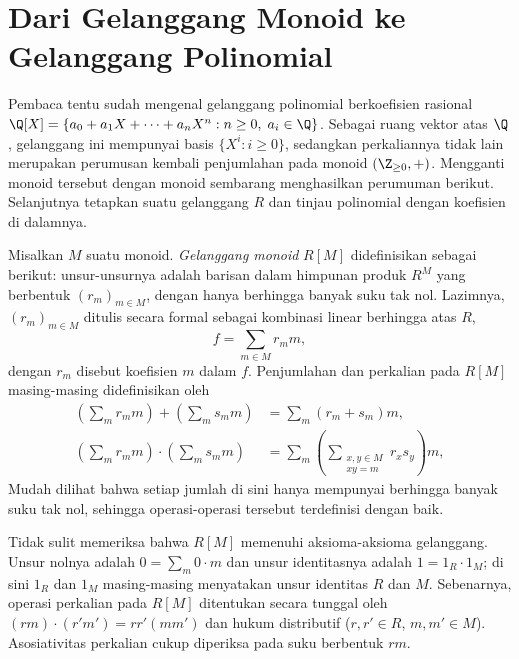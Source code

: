 \section{Dari Gelanggang Monoid ke Gelanggang Polinomial}\label{sec:polynomial-ring}
Pembaca tentu sudah mengenal gelanggang polinomial berkoefisien rasional $\Q[X] = \left\{ a_0 + a_1 X + \cdots + a_n X^n : n \geq 0, \; a_i \in \Q \right\}$. Sebagai ruang vektor atas $\Q$, gelanggang ini mempunyai basis $\{ X^i : i \geq 0 \}$, sedangkan perkaliannya tidak lain merupakan perumusan kembali penjumlahan pada monoid $(\Z_{\geq 0}, +)$. Mengganti monoid tersebut dengan monoid sembarang menghasilkan perumuman berikut. Selanjutnya tetapkan suatu gelanggang $R$ dan tinjau polinomial dengan koefisien di dalamnya.

\begin{definition}\label{def:monoidal-ring}
	Misalkan $M$ suatu monoid. \emph{Gelanggang monoid} $R[M]$ didefinisikan sebagai berikut: unsur-unsurnya adalah barisan dalam himpunan produk $R^M$ yang berbentuk $(r_m)_{m \in M}$, dengan hanya berhingga banyak suku tak nol. Lazimnya, $(r_m)_{m \in M}$ ditulis secara formal sebagai kombinasi linear berhingga atas $R$,
	\[ f = \sum_{m \in M} r_m m, \]
	dengan $r_m$ disebut koefisien $m$ dalam $f$. Penjumlahan dan perkalian pada $R[M]$ masing-masing didefinisikan oleh
	\begin{align*}
		\left( \sum_m r_m m \right) + \left( \sum_m s_m m \right) & = \sum_m (r_m + s_m) m, \\
		\left( \sum_m r_m m \right) \cdot \left( \sum_m s_m m \right) & = \sum_m \left( \sum_{\substack{x, y \in M \\ xy=m}} r_x s_y \right) m,
	\end{align*}
	Mudah dilihat bahwa setiap jumlah di sini hanya mempunyai berhingga banyak suku tak nol, sehingga operasi-operasi tersebut terdefinisi dengan baik.
\end{definition}

Tidak sulit memeriksa bahwa $R[M]$ memenuhi aksioma-aksioma gelanggang. Unsur nolnya adalah $0 = \sum_m 0 \cdot m$ dan unsur identitasnya adalah $1 = 1_R \cdot 1_M$; di sini $1_R$ dan $1_M$ masing-masing menyatakan unsur identitas $R$ dan $M$. Sebenarnya, operasi perkalian pada $R[M]$ ditentukan secara tunggal oleh $(rm) \cdot (r'm') = rr' (mm')$ dan hukum distributif ($r,r' \in R$, $m, m' \in M$). Asosiativitas perkalian cukup diperiksa pada suku berbentuk $rm$.

